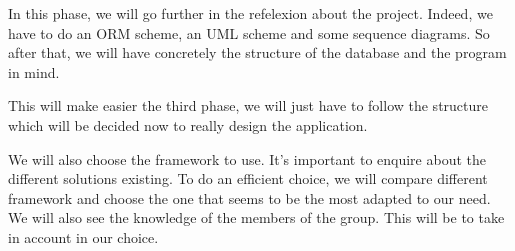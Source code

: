 In this phase, we will go further in the refelexion about the project. Indeed, we have to do an ORM scheme,
an UML scheme and some sequence diagrams. So after that, we will have concretely the structure of the 
database and the program in mind.

This will make easier the third phase, we will just have to follow the structure which will be decided 
now to really design the application.

We will also choose the framework to use. It's important to enquire about the different solutions existing. 
To do an efficient choice, we will compare different framework and choose the one that seems to be the
most adapted to our need. We will also see the knowledge of the members of the group. This will be to take
in account in our choice.